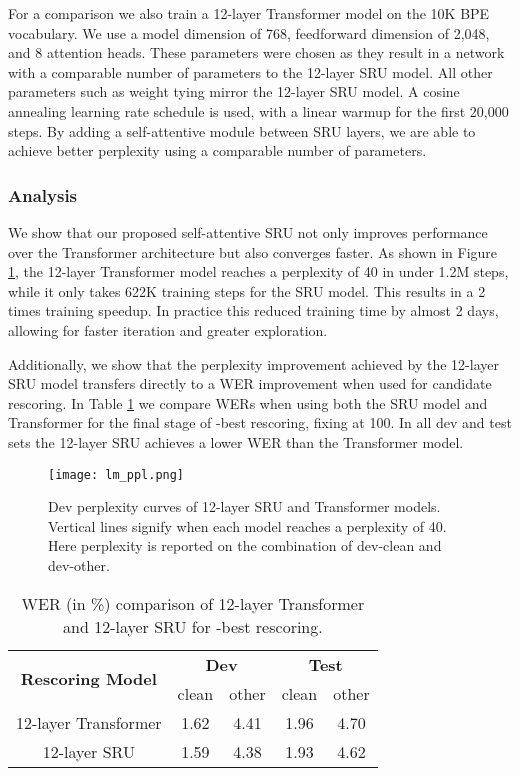\documentclass[a4paper]{article}
\begin{document}
For a comparison we also train a 12-layer Transformer model on the 10K BPE vocabulary. We use a model dimension of 768, feedforward dimension of 2,048, and 8 attention heads. These parameters were chosen as they result in a network with a comparable number of parameters to the 12-layer SRU model. All other parameters such as weight tying mirror the 12-layer SRU model. A cosine annealing learning rate schedule is used, with a linear warmup for the first 20,000 steps. By adding a self-attentive module between SRU layers, we are able to achieve better perplexity using a comparable number of parameters.


\subsubsection{Analysis}
We show that our proposed self-attentive SRU not only improves performance over the Transformer architecture but also converges faster. As shown in Figure \ref{fig:lm_ppl}, the 12-layer Transformer model reaches a perplexity of 40 in under 1.2M steps, while it only takes 622K training steps for the SRU model. This results in a 2 times training speedup. In practice this reduced training time by almost 2 days, allowing for faster iteration and greater exploration.

Additionally, we show that the perplexity improvement achieved by the 12-layer SRU model transfers directly to a WER improvement when used for candidate rescoring. In Table \ref{table:lm_wer} we compare WERs when using both the SRU model and Transformer for the final stage of -best rescoring, fixing  at 100. In all dev and test sets the 12-layer SRU achieves a lower WER than the Transformer model.


\begin{figure}[t]
\texttt{[image: lm\_ppl.png]}
  \caption{Dev perplexity curves of 12-layer SRU and Transformer models. Vertical lines signify when each model reaches a perplexity of 40. Here perplexity is reported on the combination of dev-clean and dev-other.}
  \label{fig:lm_ppl}
\end{figure}


\begin{table}[t]
\centering
\begin{tabular}{c|c|c|c|c}
\hline
\multirow{2}{*}{\textbf{Rescoring Model}} & \multicolumn{2}{c|}{\textbf{Dev}} & \multicolumn{2}{c}{\small \textbf{Test}}\\
\cline{2-5} 
& clean & other & clean & other \\
\hline
12-layer Transformer & 1.62 & 4.41 & 1.96 & 4.70 \\
\hline
12-layer SRU & 1.59 & 4.38 & 1.93 & 4.62 \\
\hline
\end{tabular}
\vspace{1em}
\caption{WER (in \%) comparison of 12-layer Transformer and 12-layer SRU for -best rescoring.}
\label{table:lm_wer}
\vspace{-5mm}
\end{table}
\end{document}

